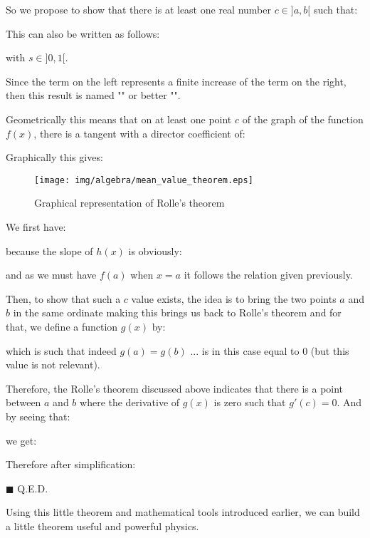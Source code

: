 	\begin{theorem}
		So we propose to show that there is at least one real number $c \in ]a,b[ $ such that:
		
	This can also be written as follows:
		
	with $s\in ]0,1[.$
	
	Since the term on the left represents a finite increase of the term on the right, then this result is named "" or better "".
	
	Geometrically this means that on at least one point $c$ of the graph of the function $f (x)$, there is a tangent with a director coefficient of:
		
	Graphically this gives:
	\begin{figure}[H]
		\centering
		\texttt{[image: img/algebra/mean\_value\_theorem.eps]}
		\caption{Graphical representation of Rolle's theorem}
	\end{figure}
	
	\end{theorem}
	\begin{dem}
	We first have:
	
	because the slope of $h(x)$ is obviously:
		
 and as we must have $f(a)$ when $x=a$ it follows the relation given previously.

Then, to show that such a $c$ value exists, the idea is to bring the two points $a$ and $b$ in the same ordinate making this brings us back to Rolle's theorem and for that, we define a function $g(x)$ by:
	
which is such that indeed $g(a)=g(b)$ ... is in this case equal to $0$ (but this value is not relevant).

Therefore, the Rolle's theorem discussed above indicates that there is a point between $a$ and $b$ where the derivative of $g(x)$ is zero such that $g'(c)=0$. And by seeing that:
	
we get:
	
	Therefore after simplification:
		
		\begin{flushright}
			$\blacksquare$  Q.E.D.
		\end{flushright}
	\end{dem}
	Using this little theorem and mathematical tools introduced earlier, we can build a little theorem useful and powerful physics.

